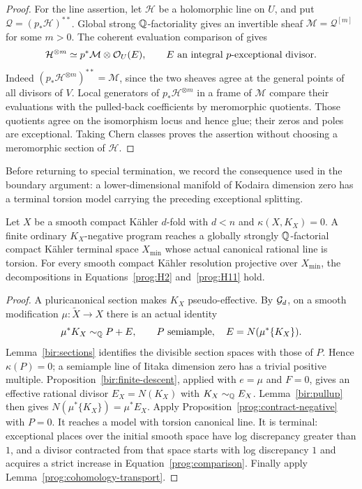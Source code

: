 \begin{proof}
For the line assertion, let \(\mathscr H\) be a holomorphic line on
\(U\), and put \(\mathscr Q=(p_*\mathscr H)^{**}\).  Global strong
\(\mathbb Q\)-factoriality gives an invertible sheaf
\(\mathscr M=\mathscr Q^{[m]}\) for some \(m>0\).  The coherent
evaluation comparison of \cite[Lemma~7.2]{CB} gives
\[
 \mathcal{H}^{\otimes m}\simeq p^*\mathcal{M}\otimes\mathcal O_U(E),
 \qquad E\ \text{an integral \(p\)-exceptional divisor}.
\]
Indeed \((p_*\mathscr H^{\otimes m})^{**}=\mathscr M\), since the
two sheaves agree at the general points of all divisors of \(V\).
Local generators of \(p_*\mathscr H^{\otimes m}\) in a frame
of \(\mathscr M\) compare their evaluations with the pulled-back
coefficients by meromorphic quotients.  Those quotients agree on the
isomorphism locus and hence glue; their zeros and poles are exceptional.
Taking Chern classes proves the assertion without choosing a meromorphic
section of \(\mathscr H\).
\end{proof}

Before returning to special termination, we record the consequence used in
the boundary argument: a lower-dimensional manifold of Kodaira dimension
zero has a terminal torsion model carrying the preceding exceptional
splitting.

\begin{corollary}
\label{prog:terminal-kappa-zero}
Let \(X\) be a smooth compact Kähler \(d\)-fold with \(d<n\)
and \(\kappa(X,K_X)=0\).  A finite ordinary \(K_X\)-negative
program reaches a globally strongly \(\mathbb Q\)-factorial compact
Kähler terminal space \(X_{\min}\) whose actual canonical
rational line is torsion.  For every smooth compact Kähler
resolution projective over \(X_{\min}\), the decompositions in
Equations~\eqref{prog:H2} and~\eqref{prog:H11} hold.
\end{corollary}

\begin{proof}
A pluricanonical section makes \(K_X\) pseudo-effective.
By \(\mathcal G_d\), on a smooth modification
\(\mu:\widetilde X\to X\) there is an actual identity
\[
 \mu^*K_X\sim_{\Q}P+E,\qquad P\ \text{semiample},\quad
 E=N(\mu^*\{K_X\}).
\]
Lemma~\ref{bir:sections} identifies the divisible section spaces
with those of \(P\).  Hence \(\kappa(P)=0\); a semiample line of
Iitaka dimension zero has a trivial positive multiple.
Proposition~\ref{bir:finite-descent}, applied with \(e=\mu\) and \(F=0\),
gives an effective rational divisor \(E_X=N(K_X)\) with
\(K_X\sim_{\mathbb Q}E_X\).
Lemma~\ref{bir:pullup} then gives
\(N(\mu^*\{K_X\})=\mu^*E_X\).
Apply Proposition~\ref{prog:contract-negative} with \(P=0\).
It reaches a model with torsion canonical line.  It is terminal:
exceptional places over the initial smooth space have log
discrepancy greater than \(1\), and a divisor contracted from
that space starts with log discrepancy \(1\) and acquires a
strict increase in Equation~\eqref{prog:comparison}.  Finally apply
Lemma~\ref{prog:cohomology-transport}.
\end{proof}

